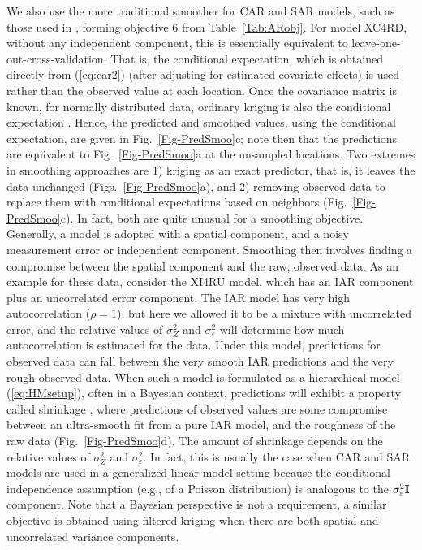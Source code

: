 \documentclass[11pt, titlepage]{article}\usepackage[]{graphicx}\usepackage[]{color}
\begin{document}
We also use the more traditional smoother for CAR and SAR models, such as those used in \citep{Clay:Kald:empi:1987}, forming objective 6 from Table~\ref{Tab:ARobj}.  For model XC4RD, without any independent component, this is essentially equivalent to leave-one-out-cross-validation. That is, the conditional expectation, which is obtained directly from (\ref{eq:car2}) (after adjusting for estimated covariate effects) is used rather than the observed value at each location. Once the covariance matrix is known, for normally distributed data, ordinary kriging is also the conditional expectation \citep[p. 108, 174]{Cres:stat:1993}.  Hence, the predicted and smoothed values, using the conditional expectation, are given in Fig.~\ref{Fig-PredSmoo}c; note then that the predictions are equivalent to Fig.~\ref{Fig-PredSmoo}a at the unsampled locations. Two extremes in smoothing approaches are 1) kriging as an exact predictor, that is, it leaves the data unchanged (Figs.~\ref{Fig-PredSmoo}a), and 2) removing observed data to replace them with conditional expectations based on neighbors (Fig.~\ref{Fig-PredSmoo}c).  In fact, both are quite unusual for a smoothing objective. Generally, a model is adopted with a spatial component, and a noisy measurement error or independent component.  Smoothing then involves finding a compromise between the spatial component and the raw, observed data. As an example for these data, consider the XI4RU model, which has an IAR component plus an uncorrelated error component.  The IAR model has very high autocorrelation ($\rho = 1$), but here we allowed it to be a mixture with uncorrelated error, and the relative values of $\sigma_Z^2$ and $\sigma^2_\varepsilon$ will determine how much autocorrelation is estimated for the data.  Under this model, predictions for observed data can fall between the very smooth IAR predictions and the very rough observed data. When such a model is formulated as a hierarchical model (\ref{eq:HMsetup}), often in a Bayesian context, predictions will exhibit a property called shrinkage \citep{Fay:Herr:esti:1979}, where predictions of observed values are some compromise between an ultra-smooth fit from a pure IAR model, and the roughness of the raw data (Fig.~\ref{Fig-PredSmoo}d).  The amount of shrinkage depends on the relative values of $\sigma_Z^2$ and $\sigma^2_\varepsilon$.  In fact, this is usually the case when CAR and SAR models are used in a generalized linear model setting because the conditional independence assumption (e.g., of a Poisson distribution) is analogous to the $\sigma^2_\varepsilon\mathbf{I}$ component.  Note that a Bayesian perspective is not a requirement, a similar objective is obtained using filtered kriging \citep[][pg. 306]{Wall:Gotw:appl:2004} when there are both spatial and uncorrelated variance components.
\end{document}
